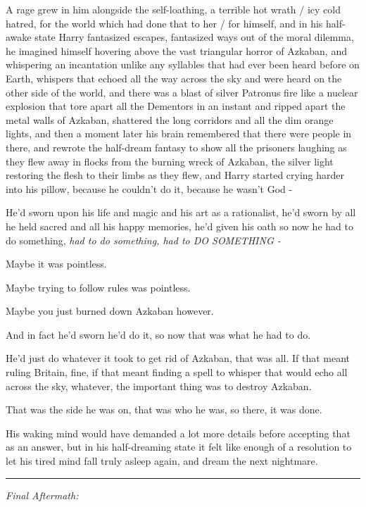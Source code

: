 A rage grew in him alongside the self-loathing, a terrible hot wrath /
icy cold hatred, for the world which had done that to her / for himself,
and in his half-awake state Harry fantasized escapes, fantasized ways
out of the moral dilemma, he imagined himself hovering above the vast
triangular horror of Azkaban, and whispering an incantation unlike any
syllables that had ever been heard before on Earth, whispers that echoed
all the way across the sky and were heard on the other side of the
world, and there was a blast of silver Patronus fire like a nuclear
explosion that tore apart all the Dementors in an instant and ripped
apart the metal walls of Azkaban, shattered the long corridors and all
the dim orange lights, and then a moment later his brain remembered that
there were people in there, and rewrote the half-dream fantasy to show
all the prisoners laughing as they flew away in flocks from the burning
wreck of Azkaban, the silver light restoring the flesh to their limbs as
they flew, and Harry started crying harder into his pillow, because he
couldn't do it, because he wasn't God -

He'd sworn upon his life and magic and his art as a rationalist, he'd
sworn by all he held sacred and all his happy memories, he'd given his
oath so now he had to do something, \emph{had to do something, had to DO
SOMETHING -}

Maybe it was pointless.

Maybe trying to follow rules was pointless.

Maybe you just burned down Azkaban however.

And in fact he'd sworn he'd do it, so now that was what he had to do.

He'd just do whatever it took to get rid of Azkaban, that was all. If
that meant ruling Britain, fine, if that meant finding a spell to
whisper that would echo all across the sky, whatever, the important
thing was to destroy Azkaban.

That was the side he was on, that was who he was, so there, it was done.

His waking mind would have demanded a lot more details before accepting
that as an answer, but in his half-dreaming state it felt like enough of
a resolution to let his tired mind fall truly asleep again, and dream
the next nightmare.

\begin{center}\rule{3in}{0.4pt}\end{center}

\emph{Final Aftermath:}

